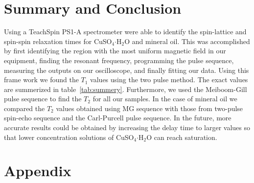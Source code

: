 \documentclass[
reprint,
amsmath,amssymb,
aps,
tikz,
border=5pt
]{revtex4-1}
\newcommand*{\cuso}[1][]{CuSO$_{4} \boldsymbol{\cdot} $H$_2$O }
\newcommand*{\tc}[1][1]{$T_#1$ }
\newcommand*{\tg}[1][2]{$T_#1$ }
\begin{document}
\section*{Summary \lowercase{and} Conclusion}


    Using a TeachSpin PS1-A spectrometer were able to identify the spin-lattice and spin-spin relaxation times for \cuso and mineral oil. This was accomplished by first identifying the region with the most uniform magnetic field in our equipment, finding the resonant frequency, programming the pulse sequence, measuring the outputs on our oscilloscope, and finally fitting our data. Using this frame work we found the \tc values using the two pulse method. The exact values are summerized in table~\ref{tab:summery}. Furthermore, we used the Meiboom-Gill pulse sequence to find the \tg for all our samples. In the case of mineral oil we compared the \tg values obtained using MG sequence with those from two-pulse spin-echo sequence and the Carl-Purcell pulse sequence. In the future, more accurate results could be  obtained by increasing the delay time to larger values so that lower concentration solutions of \cuso can reach saturation.



\clearpage

{}

\clearpage


\onecolumngrid

\section*{Appendix}
\end{document}
